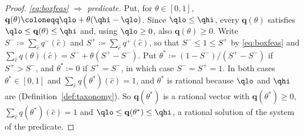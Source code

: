 \begin{proof}
\emph{\eqref{eq:boxfeas} $\Rightarrow$ predicate.} Put, for
$\theta\in[0,1]$, $\mathbf{q}(\theta)\coloneqq\qlo+\theta(\qhi-\qlo)$. Since
$\qlo\le\qhi$, every $\mathbf{q}(\theta)$ satisfies
$\qlo\le\mathbf{q}(\theta)\le\qhi$ and, using $\qlo\ge0$, also
$\mathbf{q}(\theta)\ge0$. Write $S^{-}\coloneqq\sum_{\hat c}q^{-}(\hat c)$ and
$S^{+}\coloneqq\sum_{\hat c}q^{+}(\hat c)$, so that $S^{-}\le1\le S^{+}$ by
\eqref{eq:boxfeas} and $\sum_{\hat c}q(\theta)(\hat c)=S^{-}+\theta(S^{+}-S^{-})$.
Put $\theta^{\ast}\coloneqq(1-S^{-})/(S^{+}-S^{-})$ if $S^{+}>S^{-}$, and
$\theta^{\ast}\coloneqq0$ if $S^{+}=S^{-}$, in which case $S^{-}=S^{+}=1$. In
both cases $\theta^{\ast}\in[0,1]$ and
$\sum_{\hat c}q(\theta^{\ast})(\hat c)=1$, and $\theta^{\ast}$ is rational
because $\qlo$ and $\qhi$ are (Definition~\ref{def:taxonomy}). So
$\mathbf{q}(\theta^{\ast})$ is a rational vector with
$\mathbf{q}(\theta^{\ast})\ge0$, $\sum_{\hat c}q(\theta^{\ast})(\hat c)=1$ and
$\qlo\le\mathbf{q}(\theta^{\ast})\le\qhi$, a rational solution of the system
of the predicate.
\end{proof}
